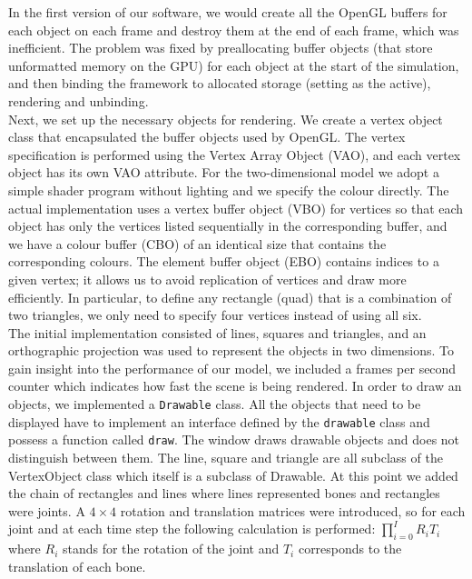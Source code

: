 \documentclass[paper=a4, fontsize=11pt]{scrartcl} %
\numberwithin{equation}{section} %
\numberwithin{figure}{section} %
\numberwithin{table}{section} %
\begin{document}
In the first version of our software, we would create all the OpenGL buffers for each object on each frame and destroy them at the end of each frame, which was inefficient. The problem was fixed by preallocating buffer objects (that store unformatted memory on the GPU) for each object at the start of the simulation, and then binding the framework to allocated storage (setting as the active), rendering and unbinding. \\

Next, we set up the necessary objects for rendering. We create a vertex object class that encapsulated the buffer objects used by OpenGL. The vertex specification is performed using the Vertex Array Object (VAO), and each vertex object has its own VAO attribute. For the two-dimensional model we adopt a simple shader program without lighting and we specify the colour directly. The actual implementation uses a vertex buffer object (VBO) for vertices so that each object has only the vertices listed sequentially in the corresponding buffer, and we have a colour buffer (CBO) of an identical size that contains the corresponding colours. The element buffer object (EBO) contains indices to a given vertex; it allows us to avoid replication of vertices and draw more efficiently. In particular, to define any rectangle (quad) that is a combination of two triangles, we only need to specify four vertices instead of using all six. \\

The initial implementation consisted of lines, squares and triangles, and an orthographic projection was used to represent the objects in two dimensions. To gain insight into the performance of our model, we included a frames per second counter which indicates how fast the scene is being rendered. In order to draw an objects, we implemented a \texttt{Drawable} class. All the objects that need to be displayed have to implement an interface defined by the \texttt{drawable} class and possess a function called \texttt{draw}. The window draws drawable objects and does not distinguish between them. The line, square and triangle are all subclass of the VertexObject class which itself is a subclass of Drawable. At this point we added the chain of rectangles and lines where lines represented bones and rectangles were joints. A \(4 \times 4\) rotation and translation matrices were introduced, so for each joint and at each time step the following calculation is performed:  \(\prod_{i=0}^I R_i T_i\) where \(R_i\) stands for the rotation of the joint and \(T_i\) corresponds to the translation of each bone. \\
\end{document}
